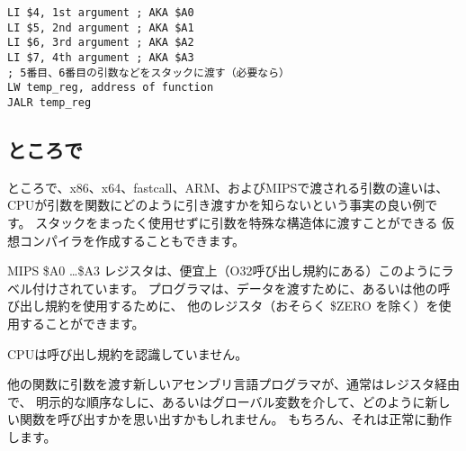 \begin{lstlisting}[caption=MIPS (O32 calling convention),style=customasmMIPS]
LI $4, 1st argument ; AKA $A0
LI $5, 2nd argument ; AKA $A1
LI $6, 3rd argument ; AKA $A2
LI $7, 4th argument ; AKA $A3
; 5番目、6番目の引数などをスタックに渡す（必要なら）
LW temp_reg, address of function
JALR temp_reg
\end{lstlisting}

\subsection{ところで}

ところで、x86、x64、fastcall、ARM、およびMIPSで渡される引数の違いは、
CPUが引数を関数にどのように引き渡すかを知らないという事実の良い例です。 
スタックをまったく使用せずに引数を特殊な構造体に渡すことができる
仮想コンパイラを作成することもできます。

MIPS \$A0 \dots \$A3 レジスタは、便宜上（O32呼び出し規約にある）このようにラベル付けされています。 
プログラマは、データを渡すために、あるいは他の呼び出し規約を使用するために、
他のレジスタ（おそらく \$ZERO を除く）を使用することができます。

\ac{CPU}は呼び出し規約を認識していません。

他の関数に引数を渡す新しいアセンブリ言語プログラマが、通常はレジスタ経由で、
明示的な順序なしに、あるいはグローバル変数を介して、どのように新しい関数を呼び出すかを思い出すかもしれません。 
もちろん、それは正常に動作します。
